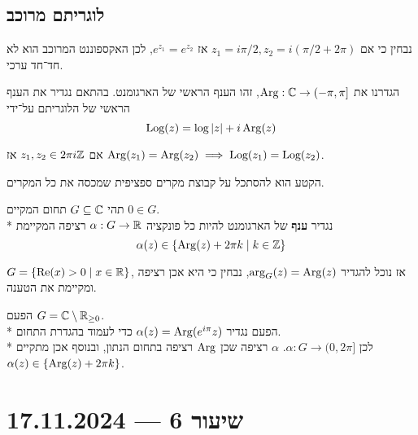 \subsection{לוגריתם מרוכב}
נבחין כי אם $z_1 = i \pi / 2, z_2 = i(\pi / 2 + 2\pi)$ אז $e^{z_1} = e^{z_2}$, לכן האקספוננט המרוכב הוא לא חד־חד ערכי.
\begin{definition}
	הגדרנו את $\operatorname{Arg} : \mathbb{C} \to (-\pi, \pi]$, זהו הענף הראשי של הארגומנט. %
	בהתאם נגדיר את הענף הראשי של הלוגריתם על־ידי
	\[
		\text{Log}(z) = \log |z| + i \operatorname{Arg}(z)
	\]
\end{definition}
\begin{remark}
	אם $z_1, z_2 \in 2\pi i \mathbb{Z}$ אז $\operatorname{Arg}(z_1) = \operatorname{Arg}(z_2) \implies \text{Log}(z_1) = \text{Log}(z_2)$.
\end{remark}
הקטע הוא להסתכל על קבוצת מקרים ספציפית שמכסה את כל המקרים.
\begin{definition}[ענף]
	תהי $G \subseteq \mathbb{C}$ תחום המקיים $0 \in G$. \\*
	נגדיר \textbf{ענף} של הארגומנט להיות כל פונקציה $\alpha : G \to \mathbb{R}$ רציפה המקיימת
	\[
		\alpha(z) \in \{ \operatorname{Arg}(z) + 2\pi k \mid k \in \mathbb{Z} \}
	\]
\end{definition}
\begin{example}
	$G = \{ \operatorname{Re}(x) > 0 \mid x \in \mathbb{R} \}$, אז נוכל להגדיר $\arg_G(z) = \operatorname{Arg}(z)$, נבחין כי היא אכן רציפה ומקיימת את הטענה.
\end{example}
\begin{example}
	הפעם $G = \mathbb{C} \setminus \mathbb{R}_{\ge 0}$. \\*
	הפעם נגדיר $\alpha(z) = \operatorname{Arg}(e^{i \pi} z)$ כדי לעמוד בהגדרת התחום. \\*
	לכן $\alpha : G \to (0, 2\pi]$. %
	$\alpha$ רציפה שכן $\operatorname{Arg}$ רציפה בתחום הנתון, ובנוסף אכן מתקיים $\alpha(z) \in \{ \operatorname{Arg}(z) + 2\pi k\}$.
\end{example}

\section{שיעור 6 --- 17.11.2024}

